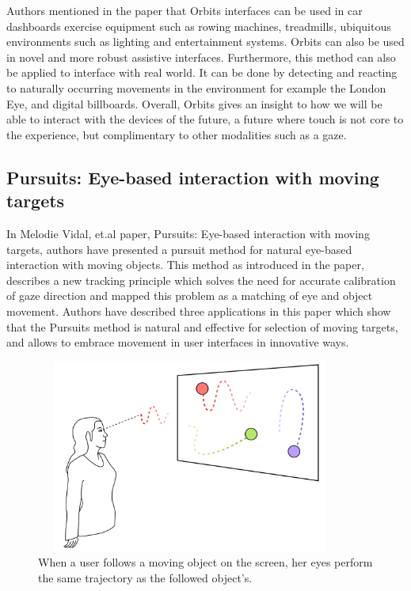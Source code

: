 Authors mentioned in the paper that Orbits interfaces can be used in car dashboards exercise equipment such as rowing machines, treadmills, ubiquitous environments such as lighting and entertainment systems. Orbits can also be used in novel and more robust assistive interfaces. Furthermore, this method can also be applied to interface with real world. It can be done by detecting and reacting to naturally occurring movements in the environment for example the London Eye, and digital billboards. Overall, Orbits gives an insight to how we will be able to interact with the devices of the future, a future where touch is not core to the experience, but complimentary to other modalities such as a gaze.

\subsection{Pursuits: Eye-based interaction with moving targets}

In Melodie Vidal, et.al \cite{6} paper, Pursuits: Eye-based interaction with moving targets, authors have presented a pursuit method for natural eye-based interaction with moving objects. This method as introduced in the paper, describes a new tracking principle which solves the need for accurate calibration of gaze direction and mapped this problem as a matching of eye and object movement. Authors have described three applications in this paper which show that the Pursuits method is natural and effective for selection of moving targets, and allows to embrace movement in user interfaces in innovative ways. 

\begin{figure}[!hbt]
  \centering
  \includegraphics[width=4in,height=2.5in]{melodie.png}
  \caption{When a user follows a moving object on the screen, her eyes perform the same trajectory as the followed object’s.}
  \label{melodie}
\end{figure}

